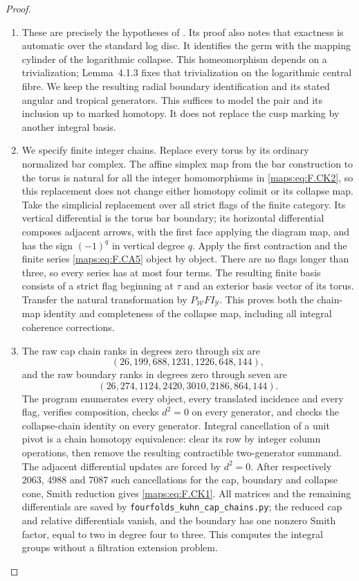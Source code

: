 \begin{proof}
\begin{enumerate}[label={$\langle1\rangle$\arabic*.}]
\item These are precisely the hypotheses of
\cite[Theorem~4.1.1, pp.~480--482]{ffAchingerOgus20}.
Its proof also notes that exactness is automatic over the
standard log disc.  It identifies the germ with the mapping
cylinder of the logarithmic collapse.  This homeomorphism
depends on a trivialization; Lemma~4.1.3 fixes that
trivialization on the logarithmic central fibre.  We keep
the resulting radial boundary identification and its stated
angular and tropical generators.  This suffices to model
the pair and its inclusion up to marked homotopy.  It does
not replace the cusp marking by another integral
basis.

\item We specify finite integer chains.  Replace every
torus by its ordinary normalized bar complex.  The affine
simplex map from the bar construction to the torus is natural
for all the integer homomorphisms in \eqref{maps:eq:F.CK2}, so this replacement
does not change either homotopy colimit or its collapse map.
Take the simplicial replacement over all strict flags of the
finite category.  Its vertical differential is the torus bar
boundary; its horizontal differential composes adjacent
arrows, with the first face applying the diagram map, and
has the sign $(-1)^q$ in vertical degree $q$.
Apply the first contraction and the finite series \eqref{maps:eq:F.CA5}
object by object.  There are no flags longer than three,
so every series has at most four terms.  The resulting
finite basis consists of a strict flag beginning at $\tau$
and an exterior basis vector of its torus.  Transfer the
natural transformation by $P_{\mathcal W}FI_{\mathcal Y}$.
This proves both the chain-map identity and completeness of
the collapse map, including all integral coherence corrections.

\item The raw cap chain ranks in degrees zero through six are
\[
 (26,199,688,1231,1226,648,144),
\]
and the raw boundary ranks in degrees zero through seven are
\[
 (26,274,1124,2420,3010,2186,864,144).
\]
The program enumerates every object, every translated
incidence and every flag, verifies composition, checks
$d^2=0$ on every generator, and checks the collapse-chain
identity on every generator.  Integral cancellation of a
unit pivot is a chain homotopy equivalence: clear its row by
integer column operations, then remove the resulting
contractible two-generator summand.  The adjacent differential
updates are forced by $d^2=0$.  After respectively 2063,
4988 and 7087 such cancellations for the cap, boundary and
collapse cone, Smith reduction gives \eqref{maps:eq:F.CK1}.  All matrices
and the remaining differentials are saved by
\texttt{fourfolds\_kuhn\_cap\_chains.py}; the reduced cap and
relative differentials vanish, and the boundary has one
nonzero Smith factor, equal to two in degree four to three.
This computes the integral groups without a filtration
extension problem.
\end{enumerate}
\end{proof}


